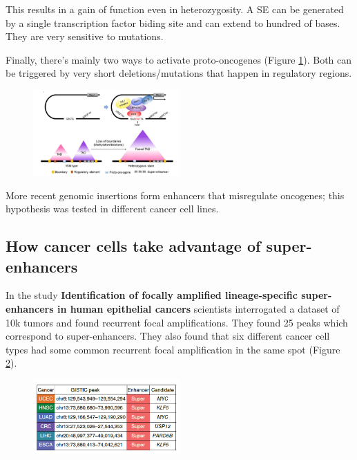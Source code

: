 This results in a gain of function even in heterozygosity. A SE can be generated by a single transcription factor biding site and can extend to hundred of bases. They are very sensitive to mutations.

Finally, there's mainly two ways to activate proto-oncogenes (Figure \ref{fig:sup}). Both can be triggered by very short deletions/mutations that happen in regulatory regions.


\begin{figure}
\centering
\includegraphics[width=0.5\textwidth]{../_resources/8bd5f4820c364c35b02c35eb0e48f464.png}
\caption{}
\label{fig:sup}
\end{figure}

More recent genomic insertions form enhancers that misregulate oncogenes; this hypothesis was tested in different cancer cell lines.

\hypertarget{how-cancer-cells-take-advantage-of-super-enhancers}{%
\subsection{How cancer cells take advantage of super-enhancers}\label{how-cancer-cells-take-advantage-of-super-enhancers}}

In the study \textbf{Identification of focally amplified lineage-specific super-enhancers in human epithelial cancers} scientists interrogated a dataset of 10k tumors and found recurrent focal amplifications. They found 25 peaks which correspond to super-enhancers. They also found that six different cancer cell types had some common recurrent focal amplification in the same spot (Figure \ref{fig:study}).

\begin{figure}
\centering
\includegraphics[width=0.5\textwidth]{../_resources/796c982294bedb0a7994a942aa5ff2a5.png}
\caption{}
\label{fig:study}
\end{figure}

